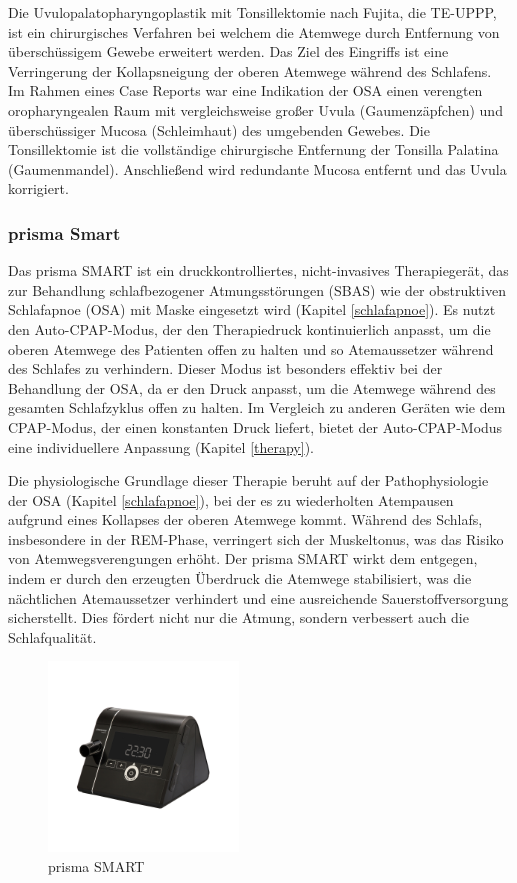 \documentclass[a4paper, 12pt]{article}
\begin{document}
\begin{itemize}
    Die Uvulopalatopharyngoplastik mit Tonsillektomie nach Fujita, die TE-UPPP, ist ein chirurgisches Verfahren bei welchem die Atemwege durch Entfernung von überschüssigem Gewebe erweitert werden. Das Ziel des Eingriffs ist eine Verringerung der Kollapsneigung der oberen Atemwege während des Schlafens. Im Rahmen eines Case Reports war eine Indikation der OSA einen verengten oropharyngealen Raum mit vergleichsweise großer Uvula (Gaumenzäpfchen) und überschüssiger Mucosa (Schleimhaut) des umgebenden Gewebes. Die Tonsillektomie ist die vollständige chirurgische Entfernung der Tonsilla Palatina (Gaumenmandel). Anschließend wird redundante Mucosa entfernt und das Uvula korrigiert. \cite{Fujita_UPPP}
\end{itemize}

\newpage
\subsubsection{prisma Smart} %
Das prisma SMART ist ein druckkontrolliertes, nicht-invasives Therapiegerät, das zur Behandlung schlafbezogener Atmungsstörungen (SBAS) wie der obstruktiven Schlafapnoe (OSA) mit Maske eingesetzt wird (Kapitel \ref{schlafapnoe}). Es nutzt den Auto-CPAP-Modus, der den Therapiedruck kontinuierlich anpasst, um die oberen Atemwege des Patienten offen zu halten und so Atemaussetzer während des Schlafes zu verhindern. Dieser Modus ist besonders effektiv bei der Behandlung der OSA, da er den Druck anpasst, um die Atemwege während des gesamten Schlafzyklus offen zu halten. Im Vergleich zu anderen Geräten wie dem CPAP-Modus, der einen konstanten Druck liefert, bietet der Auto-CPAP-Modus eine individuellere Anpassung (Kapitel \ref{therapy}). 

Die physiologische Grundlage dieser Therapie beruht auf der Pathophysiologie der OSA (Kapitel \ref{schlafapnoe}), bei der es zu wiederholten Atempausen aufgrund eines Kollapses der oberen Atemwege kommt. Während des Schlafs, insbesondere in der REM-Phase, verringert sich der Muskeltonus, was das Risiko von Atemwegsverengungen erhöht. Der prisma SMART wirkt dem entgegen, indem er durch den erzeugten Überdruck die Atemwege stabilisiert, was die nächtlichen Atemaussetzer verhindert und eine ausreichende Sauerstoffversorgung sicherstellt. Dies fördert nicht nur die Atmung, sondern verbessert auch die Schlafqualität.
\cite{manual_smart}

\begin{figure}[H]
	\centering
	\includegraphics[width=0.45\textwidth]{prisma_SMART.jpg}
	\caption{prisma SMART \cite{pic_prisma_smart}}
	\label{pic_prismaSMART}
\end{figure}
\end{document}
